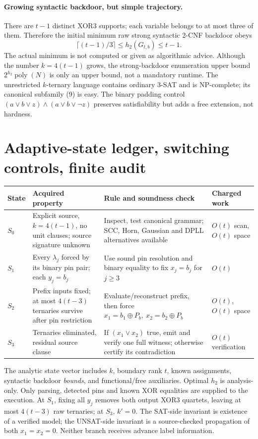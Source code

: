 \documentclass[11pt]{article}
\begin{document}
\paragraph{Growing syntactic backdoor, but simple trajectory.}
There are \(t-1\) distinct XOR3 supports; each variable belongs to at
most three of them. Therefore the initial minimum raw strong syntactic
2-CNF backdoor obeys
\[
\lceil(t-1)/3\rceil\le h_2(G_{t,b})\le t-1.   \tag{12}
\]
The actual minimum is not computed or given as algorithmic advice.
Although the number \(k=4(t-1)\) grows, the strong-backdoor enumeration
upper bound \(2^{h_2}\operatorname{poly}(N)\) is only an upper bound, not
a mandatory runtime. The unrestricted \(k\)-ternary language contains
ordinary 3-SAT and is NP-complete; its canonical subfamily (9) is easy.
The binary padding control \((a\lor b\lor z)\land(a\lor b\lor\neg z)\)
preserves satisfiability but adds a free extension, not hardness.

\section{Adaptive-state ledger, switching controls, finite audit}
\begin{center}\small
\begin{tabular}{p{.16\linewidth}p{.29\linewidth}p{.31\linewidth}p{.14\linewidth}}
\toprule
State & Acquired property & Rule and soundness check & Charged work\\
\midrule
\(S_0\) & Explicit source, \(k=4(t-1)\), no unit clauses; source signature unknown & Inspect, test canonical grammar; SCC, Horn, Gaussian and DPLL alternatives available & \(O(t)\) scan, \(O(t)\) space\\
\(S_1\) & Every \(\lambda_j\) forced by its binary pin pair; each \(y_j=b_j\) & Use sound pin resolution and binary equality to fix \(x_j=b_j\) for \(j\ge3\) & \(O(t)\)\\
\(S_2\) & Prefix inputs fixed; at most \(4(t-3)\) ternaries survive after pin restriction & Evaluate/reconstruct prefix, then force \(x_1=b_1\oplus P_b,\ x_2=b_2\oplus P_b\) & \(O(t)\), \(O(t)\) space\\
\(S_3\) & Ternaries eliminated, residual source clause & If \((x_1\lor x_2)\) true, emit and verify one full witness; otherwise certify its contradiction & \(O(t)\) verification\\
\bottomrule
\end{tabular}
\end{center}
The analytic state vector includes \(k\), boundary rank \(t\), known
assignments, syntactic backdoor \emph{bounds}, and functional/free
auxiliaries. Optimal \(h_2\) is analysis-only. Only parsing, detected
pins and known XOR equalities are supplied to the execution.
At \(S_1\), fixing all \(y_j\) removes both output XOR3 quartets,
leaving at most \(4(t-3)\) raw ternaries; at \(S_3\), \(k'=0\).
The SAT-side invariant is existence of a verified model; the UNSAT-side
invariant is a source-checked propagation of both \(x_1=x_2=0\).
Neither branch receives advance label information.
\end{document}

